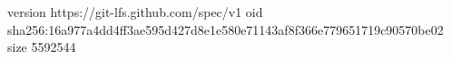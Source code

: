 version https://git-lfs.github.com/spec/v1
oid sha256:16a977a4dd4ff3ae595d427d8e1e580e71143af8f366e779651719c90570be02
size 5592544
